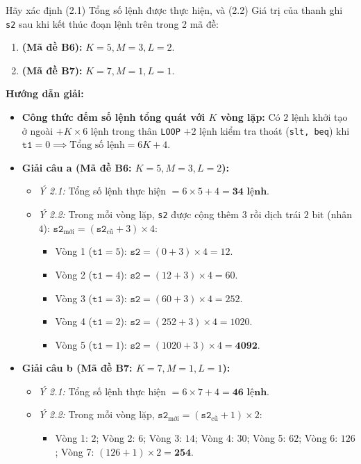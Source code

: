 Hãy xác định (2.1) Tổng số lệnh được thực hiện, và (2.2) Giá trị của thanh ghi \texttt{s2} sau khi kết thúc đoạn lệnh trên trong 2 mã đề:
\begin{enumerate}[label=\alph*)]
    \item \textbf{(Mã đề B6):} $K = 5, M = 3, L = 2$.
    \item \textbf{(Mã đề B7):} $K = 7, M = 1, L = 1$.
\end{enumerate}
\textbf{Hướng dẫn giải:}
\begin{itemize}
    \item \textbf{Công thức đếm số lệnh tổng quát với $K$ vòng lặp:} Có $2$ lệnh khởi tạo ở ngoài $+ K \times 6\text{ lệnh}$ trong thân \texttt{LOOP} $+ 2\text{ lệnh}$ kiểm tra thoát (\texttt{slt, beq}) khi $\texttt{t1} = 0 \implies \text{Tổng số lệnh} = 6K + 4$.
    \item \textbf{Giải câu a (Mã đề B6: $K = 5, M = 3, L = 2$):}
    \begin{itemize}
        \item \textit{Ý 2.1:} Tổng số lệnh thực hiện $= 6 \times 5 + 4 = \mathbf{34\text{ lệnh}}$.
        \item \textit{Ý 2.2:} Trong mỗi vòng lặp, \texttt{s2} được cộng thêm $3$ rồi dịch trái $2\text{ bit}$ (nhân $4$): $\texttt{s2}_{\text{mới}} = (\texttt{s2}_{\text{cũ}} + 3) \times 4$:
        \begin{itemize}
            \item Vòng 1 ($\texttt{t1}=5$): $\texttt{s2} = (0 + 3) \times 4 = 12$.
            \item Vòng 2 ($\texttt{t1}=4$): $\texttt{s2} = (12 + 3) \times 4 = 60$.
            \item Vòng 3 ($\texttt{t1}=3$): $\texttt{s2} = (60 + 3) \times 4 = 252$.
            \item Vòng 4 ($\texttt{t1}=2$): $\texttt{s2} = (252 + 3) \times 4 = 1020$.
            \item Vòng 5 ($\texttt{t1}=1$): $\texttt{s2} = (1020 + 3) \times 4 = \mathbf{4092}$.
        \end{itemize}
    \end{itemize}
    \item \textbf{Giải câu b (Mã đề B7: $K = 7, M = 1, L = 1$):}
    \begin{itemize}
        \item \textit{Ý 2.1:} Tổng số lệnh thực hiện $= 6 \times 7 + 4 = \mathbf{46\text{ lệnh}}$.
        \item \textit{Ý 2.2:} Trong mỗi vòng lặp, $\texttt{s2}_{\text{mới}} = (\texttt{s2}_{\text{cũ}} + 1) \times 2$:
        \begin{itemize}
            \item Vòng 1: $2$; \quad Vòng 2: $6$; \quad Vòng 3: $14$; \quad Vòng 4: $30$; \quad Vòng 5: $62$; \quad Vòng 6: $126$; \quad Vòng 7: $(126 + 1) \times 2 = \mathbf{254}$.
        \end{itemize}
    \end{itemize}
\end{itemize}

